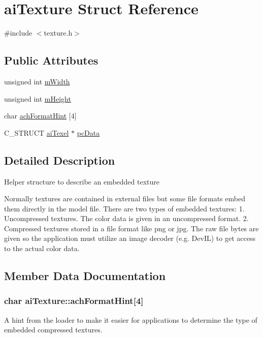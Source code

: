 \hypertarget{structaiTexture}{\section{ai\-Texture \-Struct \-Reference}
\label{structaiTexture}
}


{\ttfamily \#include $<$texture.\-h$>$}

\subsection*{\-Public \-Attributes}
\begin{DoxyCompactItemize}
\item 
unsigned int \hyperlink{structaiTexture_aaa3ad8cfe44fdc4dea2db91977d92234}{m\-Width}
\item 
unsigned int \hyperlink{structaiTexture_ac1e2fa6f1f646e9c55e3985d4418a752}{m\-Height}
\item 
char \hyperlink{structaiTexture_aa9f44996acf3b301bfeb4e5348311540}{ach\-Format\-Hint} \mbox{[}4\mbox{]}
\item 
\-C\-\_\-\-S\-T\-R\-U\-C\-T \hyperlink{structaiTexel}{ai\-Texel} $\ast$ \hyperlink{structaiTexture_aeb07528748b6e49d2d81c60006024f9a}{pc\-Data}
\end{DoxyCompactItemize}


\subsection{\-Detailed \-Description}
\-Helper structure to describe an embedded texture

\-Normally textures are contained in external files but some file formats embed them directly in the model file. \-There are two types of embedded textures\-: 1. \-Uncompressed textures. \-The color data is given in an uncompressed format. 2. \-Compressed textures stored in a file format like png or jpg. \-The raw file bytes are given so the application must utilize an image decoder (e.\-g. \-Dev\-I\-L) to get access to the actual color data. 

\subsection{\-Member \-Data \-Documentation}
\hypertarget{structaiTexture_aa9f44996acf3b301bfeb4e5348311540}{
\subsubsection[{ach\-Format\-Hint}]{\setlength{\rightskip}{0pt plus 5cm}char {\bf ai\-Texture\-::ach\-Format\-Hint}\mbox{[}4\mbox{]}}}\label{structaiTexture_aa9f44996acf3b301bfeb4e5348311540}
\-A hint from the loader to make it easier for applications to determine the type of embedded compressed textures.


